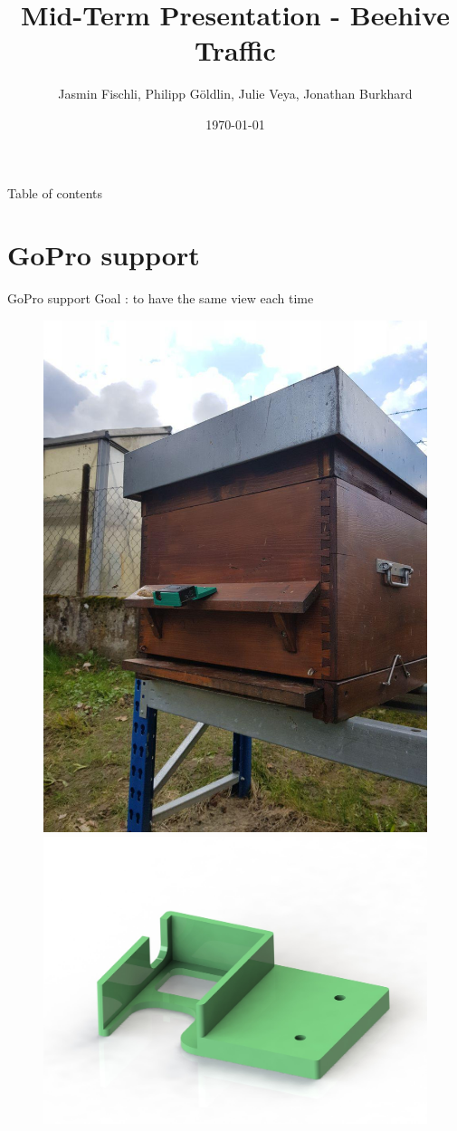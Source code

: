 \documentclass{beamer}
\author{Jasmin Fischli, Philipp Göldlin, Julie Veya, Jonathan Burkhard}
\title{Mid-Term Presentation - Beehive Traffic}
\date{\today}
\begin{document}
\frame{\maketitle}
\begin{frame}{Table of contents}{}
	\tableofcontents
\end{frame}

\section{GoPro support}
\begin{frame}{GoPro support}
Goal : to have the same view each time
\begin{figure}
\includegraphics[scale=0.25]{pictures/photoSupport}
\includegraphics[scale=0.15]{pictures/sup}

\end{figure}
\end{frame}
\end{document}
